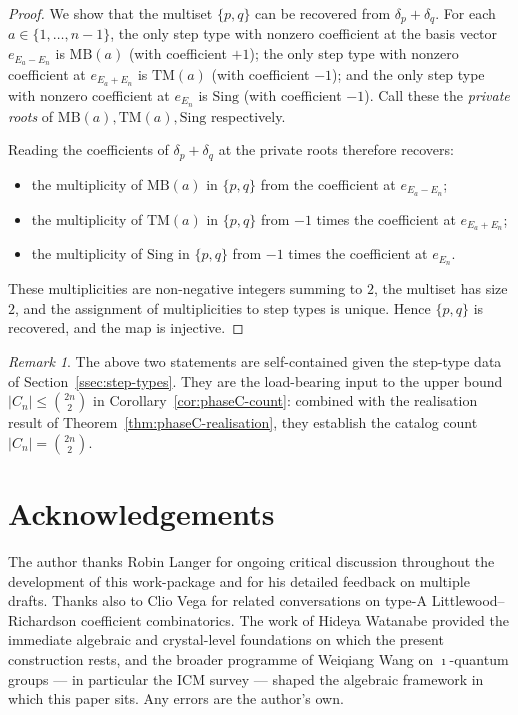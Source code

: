 \documentclass[11pt]{article}
\theoremstyle{definition}
\theoremstyle{remark}
\newtheorem{remark}[theorem]{Remark}
\newcommand{\Sing}{\mathrm{Sing}}
\newcommand{\MB}{\mathrm{MB}}
\newcommand{\TM}{\mathrm{TM}}
\begin{document}
\begin{proof}
We show that the multiset $\{p, q\}$ can be recovered from $\delta_p + \delta_q$.
For each $a \in \{1, \ldots, n - 1\}$, the only step type with nonzero
coefficient at the basis vector $e_{E_a - E_n}$ is $\MB(a)$ (with coefficient
$+1$); the only step type with nonzero coefficient at $e_{E_a + E_n}$ is
$\TM(a)$ (with coefficient $-1$); and the only step type with nonzero
coefficient at $e_{E_n}$ is $\Sing$ (with coefficient $-1$). Call these the
\emph{private roots} of $\MB(a), \TM(a), \Sing$ respectively.

Reading the coefficients of $\delta_p + \delta_q$ at the private roots therefore
recovers:
\begin{itemize}[leftmargin=2em]
  \item the multiplicity of $\MB(a)$ in $\{p, q\}$ from the coefficient at
    $e_{E_a - E_n}$;
  \item the multiplicity of $\TM(a)$ in $\{p, q\}$ from $-1$ times the
    coefficient at $e_{E_a + E_n}$;
  \item the multiplicity of $\Sing$ in $\{p, q\}$ from $-1$ times the
    coefficient at $e_{E_n}$.
\end{itemize}
These multiplicities are non-negative integers summing to $2$, the multiset has
size $2$, and the assignment of multiplicities to step types is unique. Hence
$\{p, q\}$ is recovered, and the map is injective.
\end{proof}

\begin{remark}\label{rmk:appendix-self-contained}
The above two statements are self-contained given the step-type data of
Section~\ref{ssec:step-types}. They are the load-bearing input to the upper
bound $|C_n| \leq \binom{2n}{2}$ in Corollary~\ref{cor:phaseC-count}: combined
with the realisation result of Theorem~\ref{thm:phaseC-realisation}, they
establish the catalog count $|C_n| = \binom{2n}{2}$.
\end{remark}

\section*{Acknowledgements}

The author thanks Robin Langer for ongoing critical discussion throughout the
development of this work-package and for his detailed feedback on multiple
drafts. Thanks also to Clio Vega for related conversations on type-A
Littlewood--Richardson coefficient combinatorics. The work of Hideya Watanabe
\cite{Watanabe2107,Watanabe2110} provided the immediate algebraic and
crystal-level foundations on which the present construction rests, and the
broader programme of Weiqiang Wang on $\imath$-quantum groups --- in particular
the ICM survey \cite{Wang2024Survey} --- shaped the algebraic framework in
which this paper sits. Any errors are the author's own.
\end{document}
